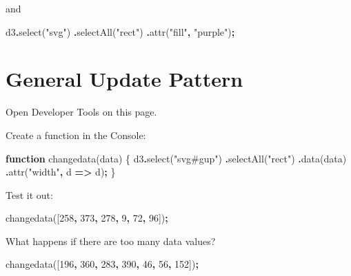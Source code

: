 \documentclass[
  openany]{book}
\newenvironment{Shaded}{\begin{snugshade}}{\end{snugshade}}
\newcommand{\DecValTok}[1]{\textcolor[rgb]{0.00,0.00,0.81}{#1}}
\newcommand{\FunctionTok}[1]{\textcolor[rgb]{0.00,0.00,0.00}{#1}}
\newcommand{\KeywordTok}[1]{\textcolor[rgb]{0.13,0.29,0.53}{\textbf{#1}}}
\newcommand{\NormalTok}[1]{#1}
\newcommand{\OperatorTok}[1]{\textcolor[rgb]{0.81,0.36,0.00}{\textbf{#1}}}
\newcommand{\StringTok}[1]{\textcolor[rgb]{0.31,0.60,0.02}{#1}}
\begin{document}
and

\begin{Shaded}
\begin{Highlighting}[]
\NormalTok{d3}\OperatorTok{.}\FunctionTok{select}\NormalTok{(}\StringTok{"svg"}\NormalTok{)}
  \OperatorTok{.}\FunctionTok{selectAll}\NormalTok{(}\StringTok{"rect"}\NormalTok{)}
  \OperatorTok{.}\FunctionTok{attr}\NormalTok{(}\StringTok{"fill"}\OperatorTok{,} \StringTok{"purple"}\NormalTok{)}\OperatorTok{;}
\end{Highlighting}
\end{Shaded}

\hypertarget{general-update-pattern}{%
\section{General Update Pattern}\label{general-update-pattern}}

Open Developer Tools on this page.

Create a function in the Console:

\begin{Shaded}
\begin{Highlighting}[]
\KeywordTok{function} \FunctionTok{changedata}\NormalTok{(data) \{}
\NormalTok{  d3}\OperatorTok{.}\FunctionTok{select}\NormalTok{(}\StringTok{"svg\#gup"}\NormalTok{)}
    \OperatorTok{.}\FunctionTok{selectAll}\NormalTok{(}\StringTok{"rect"}\NormalTok{)}
    \OperatorTok{.}\FunctionTok{data}\NormalTok{(data)}
    \OperatorTok{.}\FunctionTok{attr}\NormalTok{(}\StringTok{"width"}\OperatorTok{,}\NormalTok{ d }\KeywordTok{=\textgreater{}}\NormalTok{ d)}\OperatorTok{;}
\NormalTok{    \}}
\end{Highlighting}
\end{Shaded}

Test it out:

\begin{Shaded}
\begin{Highlighting}[]
\NormalTok{changedata([}\DecValTok{258}\OperatorTok{,} \DecValTok{373}\OperatorTok{,} \DecValTok{278}\OperatorTok{,} \DecValTok{9}\OperatorTok{,} \DecValTok{72}\OperatorTok{,} \DecValTok{96}\NormalTok{])}\OperatorTok{;}
\end{Highlighting}
\end{Shaded}

What happens if there are too many data values?

\begin{Shaded}
\begin{Highlighting}[]
\NormalTok{changedata([}\DecValTok{196}\OperatorTok{,} \DecValTok{360}\OperatorTok{,} \DecValTok{283}\OperatorTok{,} \DecValTok{390}\OperatorTok{,} \DecValTok{46}\OperatorTok{,} \DecValTok{56}\OperatorTok{,} \DecValTok{152}\NormalTok{])}\OperatorTok{;}
\end{Highlighting}
\end{Shaded}
\end{document}
